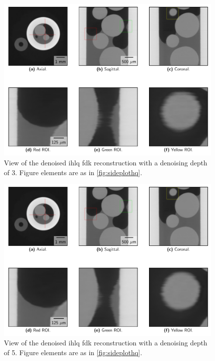 \begin{figure}[htbp]
  \centering
  \includegraphics[width=.9\textwidth]{figures/kimrobertdepth3-x475y620s250.pdf}
  \caption[View of IHLQ FDK denoised with a depth of 3]{View of the denoised \acrshort{ihlq} \acrshort{fdk} reconstruction with a denoising depth of 3. Figure elements are as in \cref{fig:sideplothq}. }
  \label{fig:sideplotdepth3}
\end{figure}

\begin{figure}[htbp]
  \centering
  \includegraphics[width=.9\textwidth]{figures/kimrobertdepth5-x475y620s250.pdf}
  \caption[View of IHLQ FDK denoised with a depth of 5]{View of the denoised \acrshort{ihlq} \acrshort{fdk} reconstruction with a denoising depth of 5. Figure elements are as in \cref{fig:sideplothq}. }
  \label{fig:sideplotdepth5}
\end{figure}

